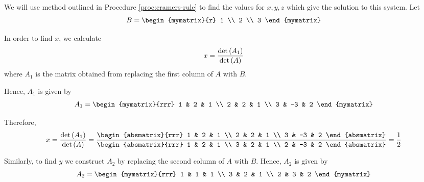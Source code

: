 \begin{solution} We will use method outlined in Procedure \ref{proc:cramers-rule} to find the values for
$x,y,z$ which give the solution to this system. 
Let
\begin{equation*}
B = 
\begin{mymatrix}{r}
1 \\
2 \\
3
\end{mymatrix} 
\end{equation*}

In order to find $x$, we calculate
\begin{equation*}
x =
\vspace{0.05in}\frac{\det \tup{A_{1}}}{\det \tup{A}}
\end{equation*}
where $A_1$ is the matrix obtained from replacing the first column of $A$ with $B$.

Hence, $A_1$ is given by 
\begin{equation*}
A_1 = 
\begin{mymatrix}{rrr}
1 & 2 & 1 \\
2 & 2 & 1 \\
3 & -3 & 2
\end{mymatrix}
\end{equation*}

Therefore,
\begin{equation*}
x=
\vspace{0.05in}\frac{\det \tup{A_{1}}}{\det \tup{A}}
=
\vspace{0.05in}\frac{\begin{absmatrix}{rrr}
1 &  2 & 1 \\
2 &  2 & 1 \\
3 & -3 & 2
\end{absmatrix} }{\begin{absmatrix}{rrr}
1 & 2 & 1 \\
3 & 2 & 1 \\
2 & -3 & 2
\end{absmatrix} }=\vspace{0.05in}\frac{1}{2}
\end{equation*}

Similarly, to find $y$ we construct $A_2$ by replacing the second column of $A$ with $B$. Hence, $A_2$ is given by
\begin{equation*}
A_2
=
\begin{mymatrix}{rrr}
1 & 1 & 1 \\
3 & 2 & 1 \\
2 & 3 & 2
\end{mymatrix}
\end{equation*}


\end{solution}
